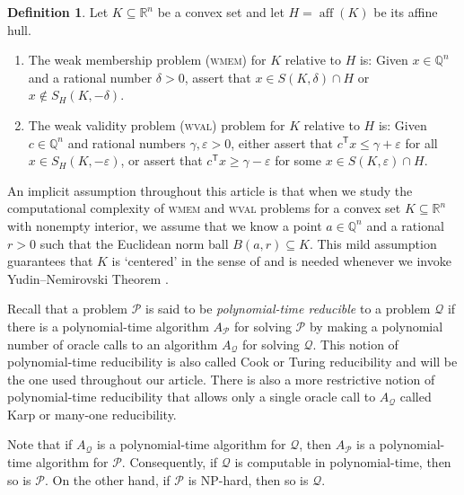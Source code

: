 \documentclass[11pt,reqno]{amsart}
\theoremstyle{definition}
\newtheorem{definition}[theorem]{Definition}
\theoremstyle{remark}
\begin{document}
\begin{definition}\label{def:relmem}
Let $K \subseteq \mathbb{R}^n$ be a convex set and let $H = \operatorname{aff}(K)$ be its affine hull.
\begin{enumerate}[\upshape (i)]
\item The weak membership problem (\textsc{wmem}) for $K$ relative to $H$ is: Given $x\in\mathbb{Q}^n$ and a rational number $\delta>0$,  assert that $x\in S(K,\delta)\cap H $ or  $x\notin S_H(K,-\delta)$.  

\item The weak validity problem (\textsc{wval}) problem for $K$ relative to $H$ is: Given $c\in\mathbb{Q}^n$ and rational numbers $\gamma,\varepsilon>0$,
either assert that $c^\mathsf{T} x\le \gamma +\varepsilon$ for all $x\in S_H(K,-\varepsilon)$, or assert that $c^\mathsf{T} x \ge \gamma -\varepsilon$ for some $x\in S(K,\varepsilon) \cap H$.
\end{enumerate}
\end{definition}

An implicit assumption throughout this article is that when we study the computational complexity of \textsc{wmem} and \textsc{wval} problems for a convex set $K \subseteq \mathbb{R}^n$ with nonempty interior, we assume that we know a point $a \in \mathbb{Q}^n$ and a rational $r > 0$ such that the Euclidean norm ball $B(a,r) \subseteq K$. This mild assumption guarantees that $K$ is `centered' in the sense of \cite[Definition~2.1.16]{GLS88} and is needed whenever we invoke Yudin--Nemirovski Theorem \cite[Theorem~4.3.2]{GLS88}.

Recall that a problem $\mathscr{P}$ is said to be \emph{polynomial-time reducible}  \cite[p.~28]{GLS88} to a problem $\mathscr{Q}$ if there is a polynomial-time algorithm $A_\mathscr{P}$ for solving $\mathscr{P}$ by making a polynomial number of oracle calls to an algorithm $A_\mathscr{Q}$  for solving $\mathscr{Q}$. This notion of polynomial-time reducibility is also called Cook  or Turing reducibility and will be the one used throughout our article. There is also a more restrictive notion of polynomial-time reducibility that allows only a single oracle call to  $A_\mathscr{Q}$ called Karp or many-one reducibility.

Note that if $A_\mathscr{Q}$ is a polynomial-time algorithm for $\mathscr{Q}$, then $A_\mathscr{P}$ is a polynomial-time algorithm for $\mathscr{P}$. Consequently, if $\mathscr{Q}$ is computable in polynomial-time, then so is $\mathscr{P}$. On the other hand, if $\mathscr{P}$ is NP-hard, then so is $\mathscr{Q}$.
\end{document}
